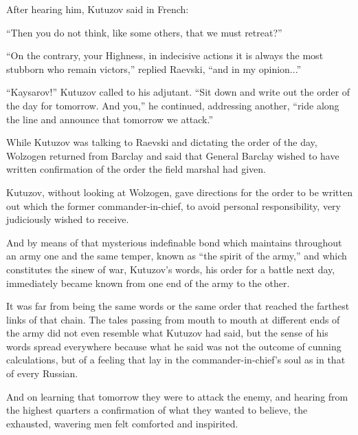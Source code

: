After hearing him, Kutuzov said in French:

``Then you do not think, like some others, that we must
retreat?''

``On the contrary, your Highness, in indecisive actions it is
always the most stubborn who remain victors,'' replied Raevski,
``and in my opinion...''

``Kaysarov!'' Kutuzov called to his adjutant. ``Sit down and
write out the order of the day for tomorrow. And you,'' he
continued, addressing another, ``ride along the line and announce
that tomorrow we attack.''

While Kutuzov was talking to Raevski and dictating the order of
the day, Wolzogen returned from Barclay and said that General
Barclay wished to have written confirmation of the order the
field marshal had given.

Kutuzov, without looking at Wolzogen, gave directions for the
order to be written out which the former commander-in-chief, to
avoid personal responsibility, very judiciously wished to
receive.

And by means of that mysterious indefinable bond which maintains
throughout an army one and the same temper, known as ``the spirit
of the army,'' and which constitutes the sinew of war, Kutuzov's
words, his order for a battle next day, immediately became known
from one end of the army to the other.

It was far from being the same words or the same order that
reached the farthest links of that chain. The tales passing from
mouth to mouth at different ends of the army did not even
resemble what Kutuzov had said, but the sense of his words spread
everywhere because what he said was not the outcome of cunning
calculations, but of a feeling that lay in the
commander-in-chief's soul as in that of every Russian.

And on learning that tomorrow they were to attack the enemy, and
hearing from the highest quarters a confirmation of what they
wanted to believe, the exhausted, wavering men felt comforted and
inspirited.


